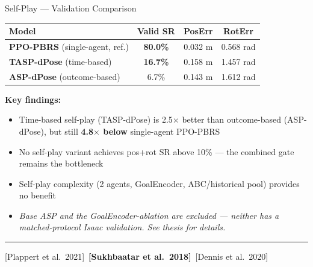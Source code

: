 \documentclass[aspectratio=169,xcolor=dvipsnames,t]{beamer}
\newcommand{\litfooter}[1]{%
  \vspace{2pt}%
  \hrule%
  \vspace{2pt}%
  {\tiny\color{LightDarkGrey} #1}%
}
\begin{document}
\begin{frame}[t]{Self-Play — Validation Comparison}
  \begin{center}
  \begin{tabular}{lccc}
    \toprule
    \textbf{Model} & \textbf{Valid SR} & \textbf{PosErr} & \textbf{RotErr} \\
    \midrule
    \rowcolor{hlgreen!15}
    \textbf{PPO-PBRS} (single-agent, ref.) & \textbf{80.0\%} & 0.032 m & 0.568 rad \\
    \midrule
    \textbf{TASP-dPose} (time-based) & \textbf{16.7\%} & 0.158 m & 1.457 rad \\
    \textbf{ASP-dPose} (outcome-based) & 6.7\% & 0.143 m & 1.612 rad \\
    \bottomrule
  \end{tabular}
  \end{center}

  \vspace{4pt}
  {\small \textbf{Key findings:}}
  \begin{itemize}
    \item Time-based self-play (TASP-dPose) is 2.5$\times$ better than outcome-based (ASP-dPose), but still \textbf{4.8$\times$ below} single-agent PPO-PBRS
    \item No self-play variant achieves pos+rot SR above 10\% — the combined gate remains the bottleneck
    \item Self-play complexity (2 agents, GoalEncoder, ABC/historical pool) provides no benefit
    \item \textit{Base ASP and the GoalEncoder-ablation are excluded — neither has a matched-protocol Isaac validation. See thesis for details.}
  \end{itemize}

  \vfill\litfooter{[Plappert et al.\ 2021]~\textbf{[Sukhbaatar et al.\ 2018]}~[Dennis et al.\ 2020]}
\end{frame}

\end{document}
